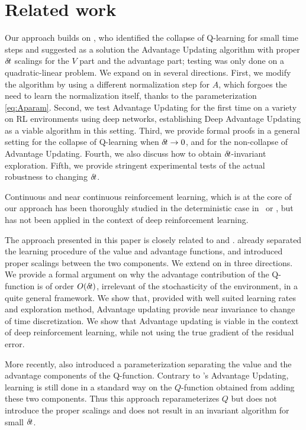 \section{Related work}
\label{sec:related}

Our approach builds on \cite{adv_upd}, who identified the collapse of
Q-learning for small time steps and suggested as a solution the Advantage
Updating algorithm with proper ${\delta\hspace{-.1em}t}$ scalings for the $V$ part and
the advantage part; testing was only done on a quadratic-linear problem.
We expand on \cite{adv_upd} in several directions. First, we modify the
algorithm by
using a different normalization step for $A$, which forgoes the need to
learn the normalization itself, thanks to the parameterization
\eqref{eq:Aparam}. Second, we test Advantage Updating for the first time on a
variety on RL environments using deep networks, establishing Deep
Advantage Updating as a viable algorithm in this setting.  Third,
we provide formal proofs in a general setting for the collapse of Q-learning when ${\delta\hspace{-.1em}t}\to
0$, and for the non-collapse of Advantage Updating.
Fourth, we also discuss how to obtain ${\delta\hspace{-.1em}t}$-invariant exploration. Fifth, we
provide stringent experimental tests of the actual robustness to changing
${\delta\hspace{-.1em}t}$.


Continuous and near continuous reinforcement learning, which is at the core of
our approach has been thoroughly studied in the deterministic case
in~\cite{adv_upd} or \cite{cont_rl}, but has not been applied in the context of
deep reinforcement learning.

The approach presented in this paper is closely related to \cite{adv_upd} and
\cite{cont_rl}. \cite{adv_upd} already separated the learning procedure of the
value and advantage functions, and introduced proper scalings between the two
components. We extend on \cite{adv_upd} in three directions. We provide a
formal argument on why the advantage contribution of the Q-function is of order
$O({\delta\hspace{-.1em}t})$, irrelevant of the stochasticity of the environment, in a quite
general framework. We show that, provided with well suited learning rates and
exploration method, Advantage updating provide near invariance to change of time
discretization. We show that Advantage updating is viable in the context of deep
reinforcement learning, while not using the true gradient of the residual error.

More recently, \cite{dueling_nets} also introduced a parameterization separating
the value and the advantage components of the Q-function. Contrary to
\cite{advup}'s Advantage Updating, learning is still done in a standard
way on the $Q$-function obtained from adding these two components. Thus this
approach reparameterizes $Q$ but does not introduce the proper scalings
and does not result in an invariant algorithm for small ${\delta\hspace{-.1em}t}$.%

